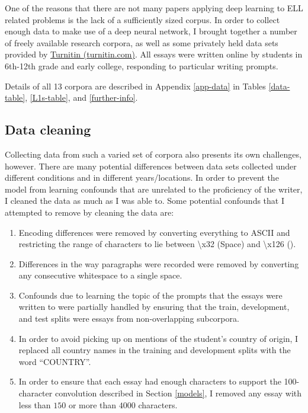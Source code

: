\documentclass{article} %
\begin{document}
One of the reasons that there are not many papers applying deep learning to ELL
related problems is the lack of a sufficiently sized corpus. In order to collect
enough data to make use of a deep neural network, I brought together a
number of freely available research corpora, as well as some privately held
data sets provided by \href{http://turnitin.com/}{Turnitin (turnitin.com)}.
All essays were written online by students in
6th-12th grade and early college, responding to particular writing prompts.

Details of all 13 corpora are described in Appendix \ref{app-data} in Tables
\ref{data-table}, \ref{L1s-table}, and \ref{further-info}.

\subsection{Data cleaning}

Collecting data from such a varied set of corpora also presents its own challenges,
however. There are many potential differences between data sets collected under
different conditions and in different years/locations. In order to prevent the
model from learning confounds that are unrelated to the proficiency of the writer,
I cleaned the data as much as I was able to. Some potential confounds that I
attempted to remove by cleaning the data are:
\begin{enumerate}
    \item Encoding differences were removed by converting everything to ASCII and
    restricting the range of characters to lie between \textbackslash x32 (Space)
    and \textbackslash x126 (\texttildelow).
    \item Differences in the way paragraphs were recorded were removed by converting
    any consecutive whitespace to a single space.
    \item Confounds due to learning the topic of the prompts that the essays were
    written to were partially handled by ensuring that the train, development, and
    test splits were essays from non-overlapping subcorpora.
    \item In order to avoid picking up on mentions of the student's country of
    origin, I replaced all country names in the training and development splits
    with the word ``COUNTRY''.
    \item In order to ensure that each essay had enough characters to support
    the 100-character convolution described in Section \ref{models}, I removed
    any essay with less than $150$ or more than $4000$ characters.
\end{enumerate}
\end{document}
